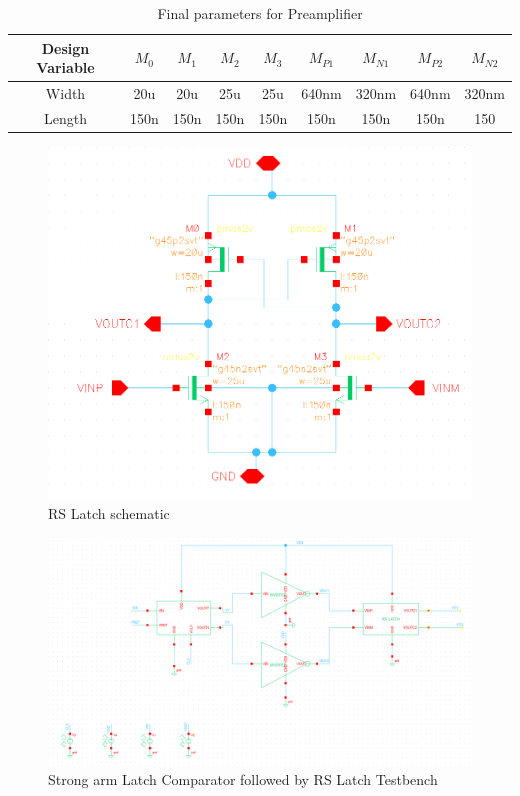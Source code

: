 \documentclass[a4paper,12pt]{article}
\begin{document}
\begin{itemize}
    \begin{table}[H]
        \centering
        \begin{tabular}{|c|c|c|c|c|c|c|c|c|}
        \hline
         Design Variable & $M_0$ & $M_1$ & $M_2$ & $M_3$ & $M_{P1}$ & $M_{N1}$ & $M_{P2}$ & $M_{N2}$ \\
         \hline
         Width & 20u & 20u & 25u & 25u & 640nm & 320nm & 640nm & 320nm\\          
         \hline
         Length & 150n & 150n & 150n & 150n & 150n & 150n & 150n  & 150\\
         \hline
        \end{tabular}
        \caption{Final parameters for Preamplifier}
        \label{tab:my_label}
    \end{table}

\begin{figure}[H]
    \centering
    \includegraphics[max width = \textwidth]{Flash_ADC_images/RSLatch.png}
    \caption{RS Latch schematic}
    \label{fig:enter-label}
\end{figure}

\begin{figure}[H]
    \centering
    \includegraphics[max width = \textwidth]{Flash_ADC_images/SAL_RSLatch.png}
    \caption{Strong arm Latch Comparator followed by RS Latch Testbench}
    \label{fig:enter-label}
\end{figure}


\end{itemize}
\end{document}
